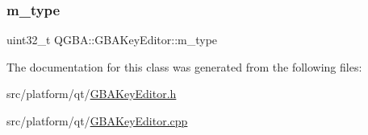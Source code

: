 \mbox{\label{class_q_g_b_a_1_1_g_b_a_key_editor_a43b774b1f04a404e84454570a9958499}} 
\subsubsection{\texorpdfstring{m\+\_\+type}{m\_type}}
{\footnotesize\ttfamily uint32\+\_\+t Q\+G\+B\+A\+::\+G\+B\+A\+Key\+Editor\+::m\+\_\+type\hspace{0.3cm}{\ttfamily [private]}}



The documentation for this class was generated from the following files\+:\begin{DoxyCompactItemize}
\item 
src/platform/qt/\mbox{\hyperlink{_g_b_a_key_editor_8h}{G\+B\+A\+Key\+Editor.\+h}}\item 
src/platform/qt/\mbox{\hyperlink{_g_b_a_key_editor_8cpp}{G\+B\+A\+Key\+Editor.\+cpp}}\end{DoxyCompactItemize}
